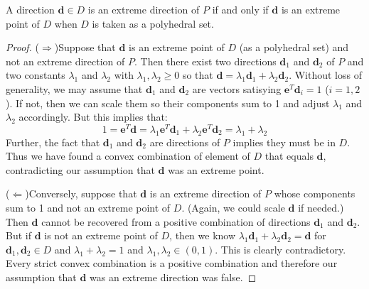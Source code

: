\begin{theorem} A direction $\mathbf{d} \in D$ is an extreme direction of $P$ if and only if $\mathbf{d}$ is an extreme point of $D$ when $D$ is taken as a polyhedral set.
\label{thm:ExtremeDirections}
\end{theorem}
\begin{proof} 
($\Rightarrow$)Suppose that $\mathbf{d}$ is an extreme point of $D$ (as a polyhedral set) and not an extreme direction of $P$. Then there exist two directions $\mathbf{d}_1$ and $\mathbf{d}_2$ of $P$ and two constants $\lambda_1$ and $\lambda_2$ with $\lambda_1,\lambda_2 \geq 0$ so that $\mathbf{d} = \lambda_1\mathbf{d}_1 + \lambda_2\mathbf{d}_2$. Without loss of generality, we may assume that $\mathbf{d}_1$ and $\mathbf{d}_2$ are vectors satisying $\mathbf{e}^T\mathbf{d}_i = 1$ ($i=1,2$). If not, then we can scale them so their components sum to 1 and adjust $\lambda_1$ and $\lambda_2$ accordingly. But this implies that:
\begin{displaymath}
1 = \mathbf{e}^T\mathbf{d} = \lambda_1 \mathbf{e}^T\mathbf{d}_1 + \lambda_2\mathbf{e}^T\mathbf{d}_2 = \lambda_1 + \lambda_2
\end{displaymath}
Further, the fact that $\mathbf{d}_1$ and $\mathbf{d}_2$ are directions of $P$ implies they must be in $D$. Thus we have found a convex combination of element of $D$ that equals $\mathbf{d}$, contradicting our assumption that $\mathbf{d}$ was an extreme point.

($\Leftarrow$)Conversely, suppose that $\mathbf{d}$ is an extreme direction  of $P$ whose components sum to 1 and not an extreme point of $D$. (Again, we could scale $\mathbf{d}$ if needed.) Then $\mathbf{d}$ cannot be recovered from a positive combination of directions $\mathbf{d}_1$ and $\mathbf{d}_2$. But if $\mathbf{d}$ is not an extreme point of $D$, then we know $\lambda_1\mathbf{d}_1 + \lambda_2\mathbf{d}_2 = \mathbf{d}$ for $\mathbf{d}_1,\mathbf{d}_2 \in D$ and $\lambda_1 + \lambda_2 = 1$ and $\lambda_1,\lambda_2 \in (0,1)$. This is clearly contradictory. Every strict convex combination is a positive combination and therefore our assumption that $\mathbf{d}$ was an extreme direction was false.
\end{proof}

